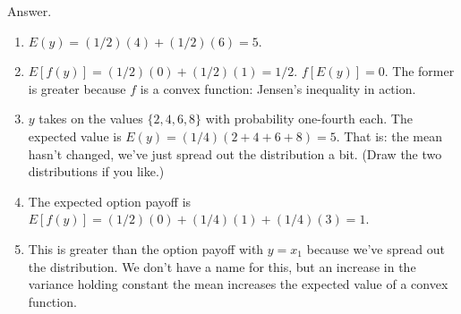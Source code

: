 \documentclass[11pt]{article}
\begin{document}
\begin{enumerate}
Answer. 
\begin{enumerate}
\item $E(y) = (1/2) (4) + (1/2) (6) = 5$.
\item $E[f(y)] = (1/2) (0) + (1/2) (1) = 1/2 $.
$f[E(y)] = 0 $.
The former is greater because $f$ is a convex function:
Jensen's inequality in action.
\item $y$ takes on the values $\{2, 4, 6, 8\}$ with probability
one-fourth each.
The expected value is $ E(y) = (1/4) (2 + 4 + 6 + 8) = 5$.
That is:  the mean hasn't changed, we've just spread out the distribution a bit.
(Draw the two distributions if you like.)
\item The expected option payoff is
$ E[f(y)] = (1/2) (0) + (1/4) (1) + (1/4) (3) = 1$.
\item This is greater than the option payoff with $ y = x_1$ because
we've spread out the distribution.
We don't have a name for this, 
but an increase in the variance holding constant
the mean increases the expected value of a convex function.
\end{enumerate}


\end{enumerate}
\end{document}
